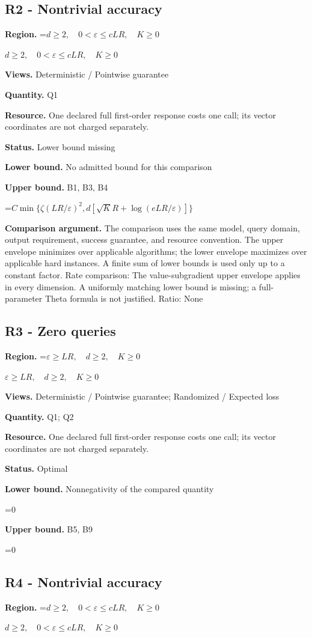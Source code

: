 \documentclass[10pt,a4paper]{article}
\newcommand{\AtlasMath}[1]{\par\begingroup\centering\setbox0=\hbox{$\displaystyle #1$}\ifdim\wd0>1.4\linewidth\typeout{ATLAS WIDE FORMULA: \the\wd0}\fi\ifdim\wd0>\linewidth\resizebox{\linewidth}{!}{\box0}\else\box0\fi\par\endgroup}
\newcommand{\AtlasInlineMath}[1]{\begingroup\setbox0=\hbox{$#1$}\ifdim\wd0>.4\linewidth\endgroup\AtlasMath{#1}\else\endgroup$#1$\fi}
\begin{document}
\subsection{R2 - Nontrivial accuracy}
\textbf{Region.} \AtlasInlineMath{d\ge2,\quad0<\varepsilon\le cLR,\quad K\ge0}

\textbf{Views.} Deterministic / Pointwise guarantee

\textbf{Quantity.} Q1

\textbf{Resource.} One declared full first-order response costs one call; its vector coordinates are not charged separately.

\textbf{Status.} Lower bound missing

\textbf{Lower bound.} No admitted bound for this comparison

\textbf{Upper bound.} B1, B3, B4

\AtlasMath{C\min\{\zeta(LR/\varepsilon)^2,d[\sqrt K R+\log(eLR/\varepsilon)]\}}
\textbf{Comparison argument.} The comparison uses the same model, query domain, output requirement, success guarantee, and resource convention. The upper envelope minimizes over applicable algorithms; the lower envelope maximizes over applicable hard instances. A finite sum of lower bounds is used only up to a constant factor. Rate comparison: The value-subgradient upper envelope applies in every dimension. A uniformly matching lower bound is missing; a full-parameter Theta formula is not justified. Ratio: None

\subsection{R3 - Zero queries}
\textbf{Region.} \AtlasInlineMath{\varepsilon\ge LR,\quad d\ge2,\quad K\ge0}

\textbf{Views.} Deterministic / Pointwise guarantee; Randomized / Expected loss

\textbf{Quantity.} Q1; Q2

\textbf{Resource.} One declared full first-order response costs one call; its vector coordinates are not charged separately.

\textbf{Status.} Optimal

\textbf{Lower bound.} Nonnegativity of the compared quantity

\AtlasMath{0}
\textbf{Upper bound.} B5, B9

\AtlasMath{0}
\subsection{R4 - Nontrivial accuracy}
\textbf{Region.} \AtlasInlineMath{d\ge2,\quad0<\varepsilon\le cLR,\quad K\ge0}
\end{document}
